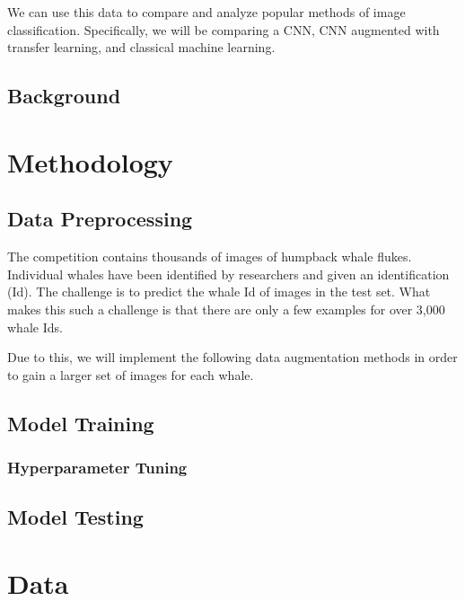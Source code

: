 \documentclass[paper=a4, fontsize=11pt]{scrartcl}
\numberwithin{equation}{section}		%
\numberwithin{table}{section}				%
\begin{document}
We can use this data to compare and analyze popular methods of image classification. Specifically, we will be comparing a CNN, CNN augmented with transfer learning, and classical machine learning.

\subsection{Background}\label{sec: background}

\section{Methodology}\label{sec: meth}
\subsection{Data Preprocessing}

The competition contains thousands of images of humpback whale flukes. Individual whales have been identified by researchers and given an identification (Id). The challenge is to predict the whale Id of images in the test set. What makes this such a challenge is that there are only a few examples for over 3,000 whale Ids.

Due to this, we will implement the following data augmentation methods in order to gain a larger set of images for each whale.

\subsection{Model Training}

\subsubsection{Hyperparameter Tuning}

\subsection{Model Testing}

\section{Data}\label{sec: data}
\end{document}
